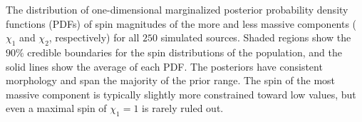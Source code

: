 \label{fig:spinPDFcred} The distribution of one-dimensional marginalized posterior probability density functions (PDFs) of spin magnitudes of the more and less massive components ($\chi_1$ and $\chi_2$, respectively) for all $250$ simulated sources. Shaded regions show the $90\%$ credible boundaries for the spin distributions of the population, and the solid lines show the average of each PDF.  The posteriors have consistent morphology and span the majority of the prior range.  The spin of the most massive component is typically slightly more constrained toward low values, but even a maximal spin of $\chi_1 = 1$ is rarely ruled out.
  
  